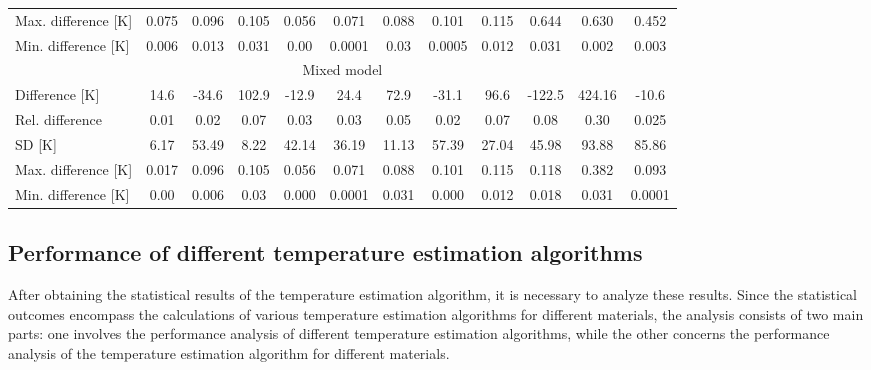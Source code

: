 {\begin{table}
\begin{tabular}{lccccccccccc}
        Max. difference {[}K{]} & 0.075                          & 0.096                         & 0.105   & 0.056   & 0.071   & 0.088   & 0.101   & 0.115   & 0.644   & 0.630   & 0.452   \\
        Min. difference {[}K{]} & 0.006                          & 0.013                         & 0.031   & 0.00    & 0.0001  & 0.03    & 0.0005  & 0.012   & 0.031   & 0.002   & 0.003   \\ \hline
        \multicolumn{12}{c}{Mixed model}                                                                                                                                                   \\ \hline
        Difference {[}K{]}      & 14.6                           & -34.6                         & 102.9   & -12.9   & 24.4    & 72.9    & -31.1   & 96.6    & -122.5  & 424.16  & -10.6    \\
        Rel. difference         & 0.01                           & 0.02                          & 0.07    & 0.03    & 0.03    & 0.05    & 0.02    & 0.07    & 0.08    & 0.30    & 0.025    \\
        SD {[}K{]}              & 6.17                           & 53.49                         & 8.22    & 42.14   & 36.19   & 11.13   & 57.39   & 27.04   & 45.98   & 93.88   & 85.86  \\
        Max. difference {[}K{]} & 0.017                          & 0.096                         & 0.105   & 0.056   & 0.071   & 0.088   & 0.101   & 0.115   & 0.118   & 0.382   & 0.093   \\
        Min. difference {[}K{]} & 0.00                           & 0.006                         & 0.03    & 0.000   & 0.0001  & 0.031   & 0.000   & 0.012   & 0.018   & 0.031   & 0.0001  
    \end{tabular}
\end{table}
}

\subsection{Performance of different temperature estimation algorithms}
After obtaining the statistical results of the temperature estimation algorithm, 
it is necessary to analyze these results. Since the statistical outcomes 
encompass the calculations of various temperature estimation algorithms 
for different materials, the analysis consists of two main parts: one involves 
the performance analysis of different temperature estimation algorithms, 
while the other concerns the performance analysis of the temperature estimation 
algorithm for different materials.


